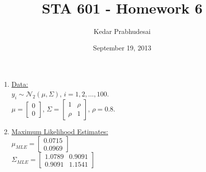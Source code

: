 \documentclass{article}
\title{STA 601 - Homework 6}
\author{Kedar Prabhudesai}
\date{September 19, 2013}
\begin{document}
\maketitle

\begin{enumerate}
\item \underline{Data:}\\
$y_i \sim \mathcal{N}_2(\mu,\Sigma)$, $i = 1,2,\ldots,100.$\\
$\mu = \left[\begin{matrix}0\\0\end{matrix}\right]$, $\Sigma = \left[\begin{matrix}1 & \rho\\\rho & 1\end{matrix}\right]$, $\rho=0.8.$\\

\item \underline{Maximum Likelihood Estimates:}\\
$\mu_{MLE} = \left[\begin{matrix}0.0715\\0.0969\end{matrix}\right]$\\
$\Sigma_{MLE} = \left[\begin{matrix}1.0789 & 0.9091\\0.9091 & 1.1541\end{matrix}\right]$\\


\end{enumerate}
\end{document}

